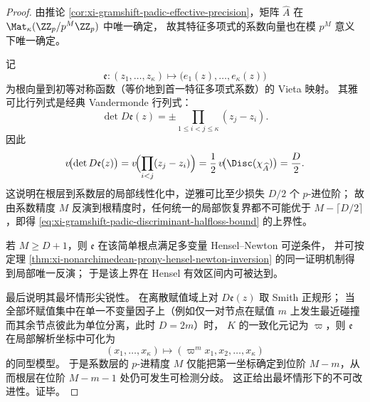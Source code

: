 \begin{proof}
由推论 \ref{cor:xi-gramshift-padic-effective-precision}，矩阵 \(\widehat A\) 在 \(\Mat_\kappa(\ZZ_p/p^{M}\ZZ_p)\) 中唯一确定，
故其特征多项式的系数向量也在模 \(p^{M}\) 意义下唯一确定。
\par
记
\[
\mathfrak e:(z_1,\dots,z_\kappa)\longmapsto
\bigl(e_1(z),\dots,e_\kappa(z)\bigr)
\]
为根向量到初等对称函数（等价地到首一特征多项式系数）的 Vieta 映射。
其雅可比行列式是经典 Vandermonde 行列式：
\[
\det D\mathfrak e(z)=\pm\prod_{1\le i<j\le\kappa}(z_j-z_i).
\]
因此
\[
v\!\bigl(\det D\mathfrak e(z)\bigr)
=
v\!\Bigl(\prod_{i<j}(z_j-z_i)\Bigr)
=
\frac12\,v\!\bigl(\Disc(\chi_{\widehat A})\bigr)
=
\frac{D}{2}.
\]
这说明在根层到系数层的局部线性化中，逆雅可比至少损失 \(D/2\) 个 \(p\)-进位阶；
故由系数精度 \(M\) 反演到根精度时，任何统一的局部恢复界都不可能优于
\(
M-\lceil D/2\rceil
\)，即得 \eqref{eq:xi-gramshift-padic-discriminant-halfloss-bound} 的上界性。
\par
若 \(M\ge D+1\)，则 \(\mathfrak e\) 在该简单根点满足多变量 Hensel--Newton 可逆条件，
并可按定理 \ref{thm:xi-nonarchimedean-prony-hensel-newton-inversion} 的同一证明机制得到局部唯一反演；
于是该上界在 Hensel 有效区间内可被达到。
\par
最后说明其最坏情形尖锐性。
在离散赋值域上对 \(D\mathfrak e(z)\) 取 Smith 正规形；
当全部坏赋值集中在单一不变量因子上（例如仅一对节点在赋值 \(m\) 上发生最近碰撞而其余节点彼此为单位分离，此时 \(D=2m\)）时，
\(K\) 的一致化元记为 \(\varpi\)，则
\(\mathfrak e\) 在局部解析坐标中可化为
\[
(x_1,\dots,x_\kappa)\longmapsto (\varpi^{m}x_1,x_2,\dots,x_\kappa)
\]
的同型模型。
于是系数层的 \(p\)-进精度 \(M\) 仅能把第一坐标确定到位阶 \(M-m\)，从而根层在位阶 \(M-m-1\) 处仍可发生可检测分歧。
这正给出最坏情形下的不可改进性。证毕。
\end{proof}

